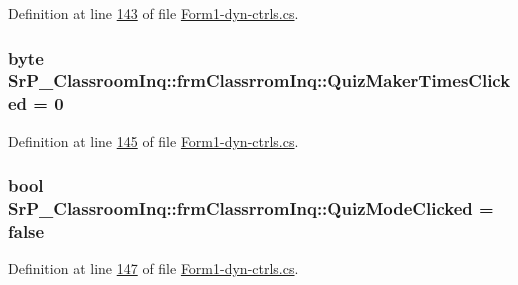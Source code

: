 \-Definition at line \hyperlink{_form1-dyn-ctrls_8cs_source_l00143}{143} of file \hyperlink{_form1-dyn-ctrls_8cs_source}{\-Form1-\/dyn-\/ctrls.\-cs}.

\hypertarget{class_sr_p___classroom_inq_1_1frm_classrrom_inq_ae28b52f195f8e33470bb7bbc988ba622}{
\subsubsection[{\-Quiz\-Maker\-Times\-Clicked}]{\setlength{\rightskip}{0pt plus 5cm}byte {\bf \-Sr\-P\-\_\-\-Classroom\-Inq\-::frm\-Classrrom\-Inq\-::\-Quiz\-Maker\-Times\-Clicked} = 0}}
\label{class_sr_p___classroom_inq_1_1frm_classrrom_inq_ae28b52f195f8e33470bb7bbc988ba622}


\-Definition at line \hyperlink{_form1-dyn-ctrls_8cs_source_l00145}{145} of file \hyperlink{_form1-dyn-ctrls_8cs_source}{\-Form1-\/dyn-\/ctrls.\-cs}.

\hypertarget{class_sr_p___classroom_inq_1_1frm_classrrom_inq_af09c14bf56f313348d1e4a533fe515bf}{
\subsubsection[{\-Quiz\-Mode\-Clicked}]{\setlength{\rightskip}{0pt plus 5cm}bool {\bf \-Sr\-P\-\_\-\-Classroom\-Inq\-::frm\-Classrrom\-Inq\-::\-Quiz\-Mode\-Clicked} = false}}
\label{class_sr_p___classroom_inq_1_1frm_classrrom_inq_af09c14bf56f313348d1e4a533fe515bf}


\-Definition at line \hyperlink{_form1-dyn-ctrls_8cs_source_l00147}{147} of file \hyperlink{_form1-dyn-ctrls_8cs_source}{\-Form1-\/dyn-\/ctrls.\-cs}.

